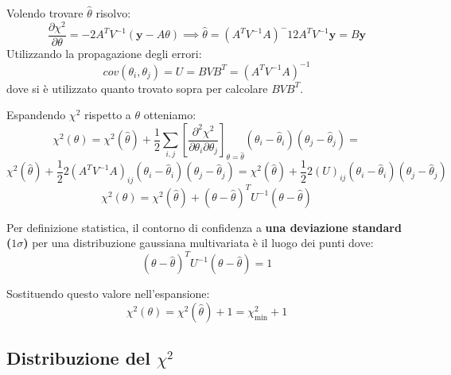 \documentclass[openany,a4paper,12pt]{book}
\theoremstyle{remark}
\begin{document}
Volendo trovare $\hat \theta$ risolvo:
\[
\frac{\partial \chi^2}{\partial \theta} = -2 A^T V^{-1} (\mathbf{y} - A\theta) \implies \hat \theta = (A^T V^{-1} A )^-1 2 A^T V^{-1} \mathbf{y} = B \mathbf{y}
\]
Utilizzando la propagazione degli errori:
\[
cov(\theta_i, \theta_j) =  U = B V B^T = (A^T V^{-1} A)^{-1}
\]
dove si è utilizzato quanto trovato sopra per calcolare $B V B^T $.

Espandendo $\chi^2$ rispetto a $\theta$ otteniamo:
\begin{equation*}
    \chi^2(\theta) = \chi^2(\hat{\theta}) + \frac{1}{2} \sum_{i,j} \left[ \frac{\partial^2 \chi^2}{\partial \theta_i \partial \theta_j} \right]_{\theta=\hat{\theta}} (\theta_i - \hat{\theta}_i)(\theta_j - \hat{\theta}_j) =
\end{equation*}
\begin{equation*}
    \chi^2(\hat{\theta}) + \frac{1}{2}2(A^T V^{-1} A)_{ij} (\theta_i - \hat{\theta}_i)(\theta_j - \hat{\theta}_j) =
    \chi^2(\hat{\theta}) + \frac{1}{2}2(U)_{ij} (\theta_i - \hat{\theta}_i)(\theta_j - \hat{\theta}_j) 
\end{equation*}
\begin{equation*}
\chi^2(\theta) = \chi^2(\hat{\theta}) + (\theta - \hat{\theta})^T U^{-1} (\theta - \hat{\theta})
\end{equation*}

Per definizione statistica, il contorno di confidenza a \textbf{una deviazione standard ($1\sigma$)} per una distribuzione gaussiana multivariata è il luogo dei punti dove:
\begin{equation*}
(\theta - \hat{\theta})^T U^{-1} (\theta - \hat{\theta}) = 1
\end{equation*}

Sostituendo questo valore nell'espansione:
\begin{equation}
\chi^2(\theta) = \chi^2(\hat{\theta}) + 1 = \chi^2_{\text{min}} + 1
\end{equation}

\subsection{Distribuzione del $\chi^2$}
\end{document}
